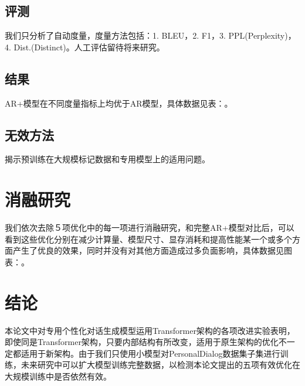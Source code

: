 \documentclass[letterpaper]{article} %
\DeclareRobustCommand{\citeext}[1]{\cite[#1]{#1}}
\begin{document}
\begin{CJK*}{UTF8}{gbsn}
\subsection[Evaluation]{评测} 
我们只分析了自动度量，度量方法包括：1. BLEU\citeext{Papineni2002}，2. F1，3. PPL(Perplexity)，4. Dist.(Distinct)\citeext{Li2016}。人工评估留待将来研究。

\subsection[Result]{结果} 
AR+模型在不同度量指标上均优于AR模型，具体数据见表：。


\subsection[Ineffective Methods]{无效方法} 

揭示预训练在大规模标记数据和专用模型上的适用问题。

\section[Ablation Study]{消融研究} 
我们依次去除５项优化中的每一项进行消融研究，和完整AR+模型对比后，可以看到这些优化分别在减少计算量、模型尺寸、显存消耗和提高性能某一个或多个方面产生了优良的效果，同时并没有对其他方面造成过多负面影响，具体数据见图表：。

\section[Conclusion]{结论} 
本论文中对专用个性化对话生成模型运用Transformer架构的各项改进实验表明，即使同是Transformer架构，只要内部结构有所改变，适用于原生架构的优化不一定都适用于新架构。由于我们只使用小模型对PersonalDialog数据集子集进行训练，未来研究中可以扩大模型训练完整数据，以检测本论文提出的五项有效优化在大规模训练中是否依然有效。




\clearpage\end{CJK*}
\end{document}
